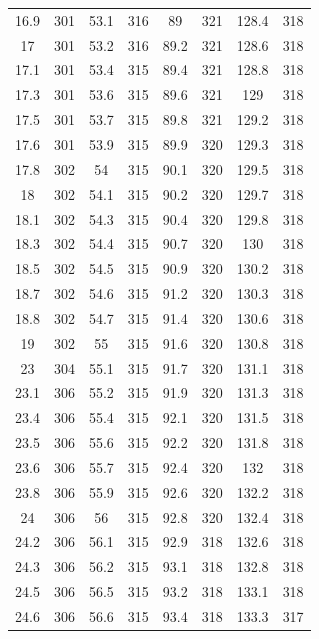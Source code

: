 \documentclass[12pt]{ctexart}
\numberwithin{equation}{section}
\begin{document}
\begin{longtable}{cc|cc|cc|cc}
16.9  &  301  &  53.1  &  316  &  89  &  321  &  128.4  &  318  \\
17  &  301  &  53.2  &  316  &  89.2  &  321  &  128.6  &  318  \\
17.1  &  301  &  53.4  &  315  &  89.4  &  321  &  128.8  &  318  \\
17.3  &  301  &  53.6  &  315  &  89.6  &  321  &  129  &  318  \\
17.5  &  301  &  53.7  &  315  &  89.8  &  321  &  129.2  &  318  \\
17.6  &  301  &  53.9  &  315  &  89.9  &  320  &  129.3  &  318  \\
17.8  &  302  &  54  &  315  &  90.1  &  320  &  129.5  &  318  \\
18  &  302  &  54.1  &  315  &  90.2  &  320  &  129.7  &  318  \\
18.1  &  302  &  54.3  &  315  &  90.4  &  320  &  129.8  &  318  \\
18.3  &  302  &  54.4  &  315  &  90.7  &  320  &  130  &  318  \\
18.5  &  302  &  54.5  &  315  &  90.9  &  320  &  130.2  &  318  \\
18.7  &  302  &  54.6  &  315  &  91.2  &  320  &  130.3  &  318  \\
18.8  &  302  &  54.7  &  315  &  91.4  &  320  &  130.6  &  318  \\
19  &  302  &  55  &  315  &  91.6  &  320  &  130.8  &  318  \\
23  &  304  &  55.1  &  315  &  91.7  &  320  &  131.1  &  318  \\
23.1  &  306  &  55.2  &  315  &  91.9  &  320  &  131.3  &  318  \\
23.4  &  306  &  55.4  &  315  &  92.1  &  320  &  131.5  &  318  \\
23.5  &  306  &  55.6  &  315  &  92.2  &  320  &  131.8  &  318  \\
23.6  &  306  &  55.7  &  315  &  92.4  &  320  &  132  &  318  \\
23.8  &  306  &  55.9  &  315  &  92.6  &  320  &  132.2  &  318  \\
24  &  306  &  56  &  315  &  92.8  &  320  &  132.4  &  318  \\
24.2  &  306  &  56.1  &  315  &  92.9  &  318  &  132.6  &  318  \\
24.3  &  306  &  56.2  &  315  &  93.1  &  318  &  132.8  &  318  \\
24.5  &  306  &  56.5  &  315  &  93.2  &  318  &  133.1  &  318  \\
24.6  &  306  &  56.6  &  315  &  93.4  &  318  &  133.3  &  317  \\

\end{longtable}
\end{document}
